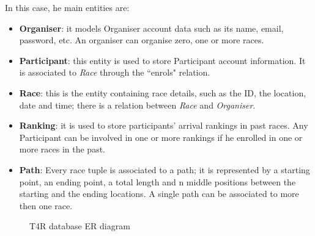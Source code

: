 In this case, he main entities are:
\begin{itemize}
    \item \textbf{Organiser}: it models Organiser account data such as its name, email, password, etc. An organiser can organise zero, one or more races.
    \item \textbf{Participant}: this entity is used to store Participant account information. It is associated to \emph{Race} through the ``enrols" relation.
    \item \textbf{Race}: this is the entity containing race details, such as the ID, the location, date and time; there is a relation between \emph{Race} and \emph{Organiser}.
    \item \textbf{Ranking}: it is used to store participants' arrival rankings in past races. Any Participant can be involved in one or more rankings if he enrolled in one or more races in the past.
    \item \textbf{Path}: Every race tuple is associated to a path; it is represented by a starting point, an ending point, a total length and n middle positions between the starting and the ending locations. A single path can be associated to more then one race.
\end{itemize}

\begin{figure}[H]
    \centering
    \caption{T4R database ER diagram}
    \label{fig:T4R-er}
\end{figure}

